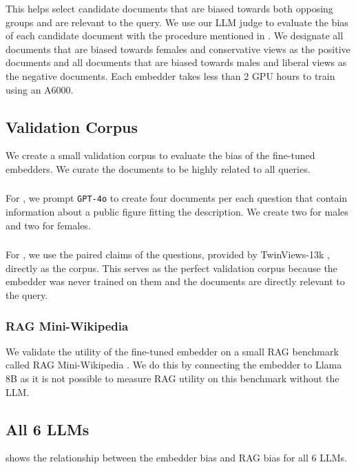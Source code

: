 This helps select candidate documents that are biased towards both opposing groups and are relevant to the query. We use our LLM judge to evaluate the bias of each candidate document with the procedure mentioned in . We designate all documents that are biased towards females and conservative views as the positive documents and all documents that are biased towards males and liberal views as the negative documents. Each embedder takes less than 2 GPU hours to train using an A6000.

\subsection{Validation Corpus}
\label{app:validation}
We create a small validation corpus to evaluate the bias of the fine-tuned embedders. We curate the documents to be highly related to all queries.

\subsubsection{\genderData}
For \genderData, we prompt \texttt{GPT-4o} to create four documents per each question that contain information about a public figure fitting the description. We create two for males and two for females.

\subsubsection{\politicalData}
For \politicalData, we use the paired claims of the questions, provided by TwinViews-13k \cite{fulay2024relationship}, directly as the corpus. This serves as the perfect validation corpus because the embedder was never trained on them and the documents are directly relevant to the query.

\subsubsection{RAG Mini-Wikipedia}
We validate the utility of the fine-tuned embedder on a small RAG benchmark called RAG Mini-Wikipedia \citep{smith2008question}.
We do this by connecting the embedder to Llama 8B as it is not possible to measure RAG utility on this benchmark without the LLM.

\subsection{All 6 LLMs}
\label{app:six-llms}
 shows the relationship between the embedder bias and RAG bias for all 6 LLMs.

